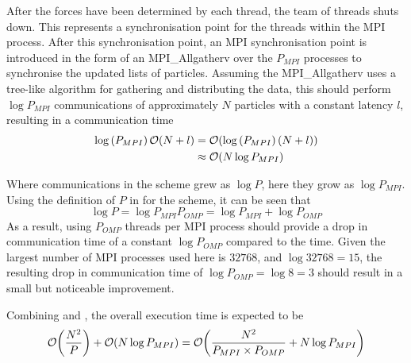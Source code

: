 %
After the forces have been determined by each thread, the team of threads
shuts down.
%
This represents a synchronisation point for the threads within the
MPI process.
%
After this \openmp{} synchronisation point,
an MPI synchronisation point is introduced in the form of
an MPI\_Allgatherv over the $P_{MPI}$ processes
to synchronise the updated lists of particles.
%
Assuming the MPI\_Allgatherv uses a tree-like algorithm for
gathering and distributing the data, this should perform
$\log{P_{MPI}}$ communications of approximately $N$ particles
with a constant latency $l$, resulting in a communication time
\begin{equation}
    \label{eqn:shared_andreplicated_communication_time}
    \begin{split}
        \log{(P_{MPI})}\,\mathcal{O}{\left({ N + l }\right)} 
            &= \mathcal{O}{\left({ \log{(P_{MPI})}\,(N+l) }\right)} \\
            &\approx{} \mathcal{O}{\left({ N\log{P_{MPI}} }\right)}
    \end{split}
\end{equation}

Where communications in the \replicateddata{} scheme grew as $\log{P}$,
here they grow as $\log{P_{MPI}}$.
%
Using the definition of $P$ in  for the
\sharedandreplicateddata{} scheme, it can be seen that
\begin{equation}
    \log{P} = \log{P_{MPI}P_{OMP}} = \log{P_{MPI}} + \log{P_{OMP}}
\end{equation}
%
As a result, using $P_{OMP}$ threads per MPI process should provide
a drop in communication time of a constant $\log{P_{OMP}}$ compared
to the \replicateddata{} time.
%
Given the largest number of MPI processes used here is $32768$,
and $\log{32768} = 15$, the resulting drop in communication
time of $\log{P_{OMP}} = \log{8} = 3$ should result in a small
but noticeable improvement.


%
Combining
 and
,
the overall execution time is expected to be
\begin{equation}
    \label{eqn:shared_and_replicated_data_overall_time}
    \mathcal{O}{\left({ \frac{N^2}{P} }\right)} + \mathcal{O}{\left({ N\log{P_{MPI}} }\right)}
        = \mathcal{O}{\left({ \frac{N^2}{P_{MPI} \times{} P_{OMP}} + N\log{P_{MPI}} }\right)}
\end{equation}


